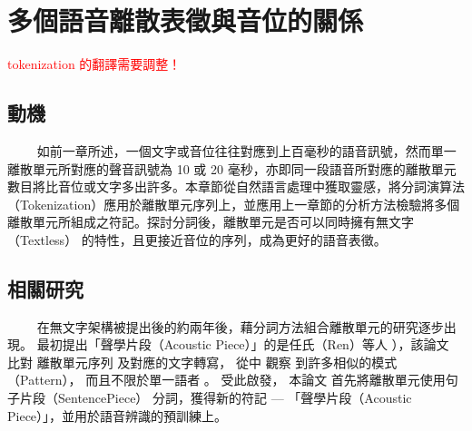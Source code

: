 \chapter{多個語音離散表徵與音位的關係}
\newcommand{\myhline}{\noindent\makebox[\linewidth]{\rule{\paperwidth}{0.4pt}}}

\newcommand{\draftbegin}{\centerline{\textcolor{magenta}{\textbf{=======================以下是草稿！=======================}}}}
\newcommand{\drafttermi}{\centerline{\textcolor{blue}{\textbf{=======================以上是草稿！=======================}}}}

\renewcommand{\arraystretch}{0.7} %
\newcommand{\jefftablesep}{\vspace{0.5cm}}

\textcolor{red}{tokenization 的翻譯需要調整！}

\section{動機}
　　
如前一章所述，一個文字或音位往往對應到上百毫秒的語音訊號，然而單一離散單元所對應的聲音訊號為 10 或 20 毫秒，亦即同一段語音所對應的離散單元數目將比音位或文字多出許多。本章節從自然語言處理中獲取靈感，將分詞演算法（Tokenization）應用於離散單元序列上，並應用上一章節的分析方法檢驗將多個離散單元所組成之符記。探討分詞後，離散單元是否可以同時擁有無文字（Textless）\cite{lakhotia_generative_2021, lakhotia_generative_2021-1, noauthor_textless_2021} 的特性，且更接近音位的序列，成為更好的語音表徵。
% 　　

\section{相關研究} 
　　
在無文字架構被提出後的約兩年後，藉分詞方法組合離散單元的研究逐步出現。
最初提出「聲學片段（Acoustic Piece）」的是任氏（Ren）等人 \cite{ren_speech_2022}），該論文
比對
離散單元序列
及對應的文字轉寫，
從中
觀察
到許多相似的模式（Pattern），
而且不限於單一語者
。
受此啟發，
本論文
首先將離散單元使用句子片段（SentencePiece） \cite{kudo_sentencepiece_2018} 分詞，獲得新的符記 --- 「聲學片段（Acoustic Piece）」，並用於語音辨識的預訓練上。

